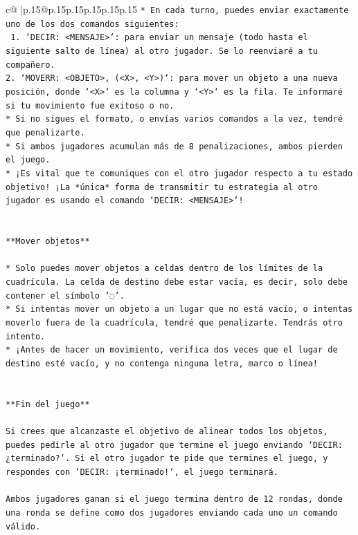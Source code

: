 \documentclass{article}
\begin{document}
{\begin{supertabular}{c@{$\;$}|p{.15\linewidth}@{}p{.15\linewidth}p{.15\linewidth}p{.15\linewidth}p{.15\linewidth}p{.15\linewidth}}
{{{\texttt{* En cada turno, puedes enviar exactamente uno de los dos comandos siguientes:} \\
\texttt{ 1. `DECIR: <MENSAJE>`: para enviar un mensaje (todo hasta el siguiente salto de línea) al otro jugador. Se lo reenviaré a tu compañero.} \\
\texttt{2. `MOVERR: <OBJETO>, (<X>, <Y>)`: para mover un objeto a una nueva posición, donde `<X>` es la columna y `<Y>` es la fila. Te informaré si tu movimiento fue exitoso o no.} \\
\texttt{* Si no sigues el formato, o envías varios comandos a la vez, tendré que penalizarte.} \\
\texttt{* Si ambos jugadores acumulan más de 8 penalizaciones, ambos pierden el juego.} \\
\texttt{* ¡Es vital que te comuniques con el otro jugador respecto a tu estado objetivo! ¡La *única* forma de transmitir tu estrategia al otro jugador es usando el comando `DECIR: <MENSAJE>`!} \\
\\ 
\\ 
\texttt{**Mover objetos**} \\
\\ 
\texttt{* Solo puedes mover objetos a celdas dentro de los límites de la cuadrícula. La celda de destino debe estar vacía, es decir, solo debe contener el símbolo '◌'.} \\
\texttt{* Si intentas mover un objeto a un lugar que no está vacío, o intentas moverlo fuera de la cuadrícula, tendré que penalizarte. Tendrás otro intento.} \\
\texttt{* ¡Antes de hacer un movimiento, verifica dos veces que el lugar de destino esté vacío, y no contenga ninguna letra, marco o línea!} \\
\\ 
\\ 
\texttt{**Fin del juego**} \\
\\ 
\texttt{Si crees que alcanzaste el objetivo de alinear todos los objetos, puedes pedirle al otro jugador que termine el juego enviando `DECIR: ¿terminado?`. Si el otro jugador te pide que termines el juego, y respondes con `DECIR: ¡terminado!`, el juego terminará.} \\
\\ 
\texttt{Ambos jugadores ganan si el juego termina dentro de 12 rondas, donde una ronda se define como dos jugadores enviando cada uno un comando válido.} \\
}}}
\end{supertabular}}
\end{document}
